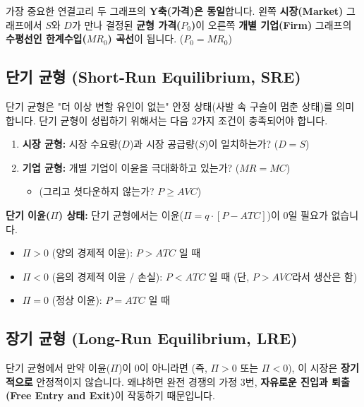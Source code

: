 \documentclass[11pt,a4paper]{book}
\theoremstyle{definition}
\begin{document}
\begin{mybox}{가장 중요한 연결고리}
두 그래프의 \textbf{Y축(가격)은 동일}합니다.
왼쪽 \textbf{시장(Market)} 그래프에서 $S$와 $D$가 만나 결정된 \textbf{균형 가격($P_0$)}이
오른쪽 \textbf{개별 기업(Firm)} 그래프의 \textbf{수평선인 한계수입($MR_0$) 곡선}이 됩니다.
($P_0 = MR_0$)
\end{mybox}

\subsection{단기 균형 (Short-Run Equilibrium, SRE)}

단기 균형은 "더 이상 변할 유인이 없는" 안정 상태(사발 속 구슬이 멈춘 상태)를 의미합니다.
단기 균형이 성립하기 위해서는 다음 2가지 조건이 충족되어야 합니다.

\begin{enumerate}
    \item \textbf{시장 균형:} 시장 수요량($D$)과 시장 공급량($S$)이 일치하는가? ($D=S$)
    \item \textbf{기업 균형:} 개별 기업이 이윤을 극대화하고 있는가? ($MR=MC$)
    \begin{itemize}
        \item (그리고 셧다운하지 않는가? $P \ge AVC$)
    \end{itemize}
\end{enumerate}

\textbf{단기 이윤($\Pi$) 상태:}
단기 균형에서는 이윤($\Pi = q \cdot [P - ATC]$)이 0일 필요가 없습니다.
\begin{itemize}
    \item $\Pi > 0$ (양의 경제적 이윤): $P > ATC$ 일 때
    \item $\Pi < 0$ (음의 경제적 이윤 / 손실): $P < ATC$ 일 때 (단, $P > AVC$라서 생산은 함)
    \item $\Pi = 0$ (정상 이윤): $P = ATC$ 일 때
\end{itemize}

\subsection{장기 균형 (Long-Run Equilibrium, LRE)}

단기 균형에서 만약 이윤($\Pi$)이 0이 아니라면 (즉, $\Pi > 0$ 또는 $\Pi < 0$),
이 시장은 \textbf{장기적으로} 안정적이지 않습니다.
왜냐하면 완전 경쟁의 가정 3번, \textbf{자유로운 진입과 퇴출(Free Entry and Exit)}이 작동하기 때문입니다.
\end{document}

